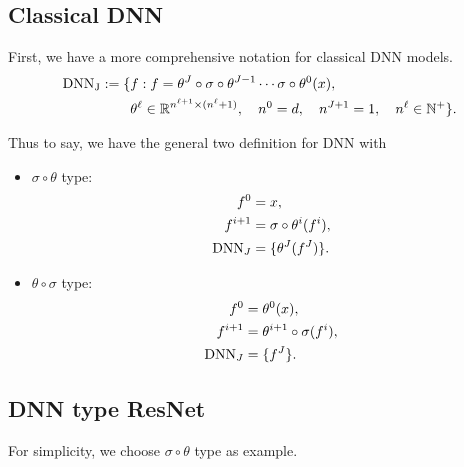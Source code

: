 \subsection{Classical DNN}
First, we have a more comprehensive notation for classical DNN models.
\begin{equation}\label{eq:DNNdef_J}
\begin{aligned}
{\rm{DNN}_J} :=\{& f:f=
\theta^J \circ \sigma \circ \theta^{J-1} \cdots \sigma \circ \theta^0(x), \\
&\theta^\ell \in \mathbb{R}^{n^{\ell+1} \times (n^\ell+1)}, \quad n^0 = d, \quad n^{J+1} = 1, \quad n^\ell \in \mathbb{N}^+\}.
\end{aligned}
\end{equation}

Thus to say, we have the general two definition for DNN with
\begin{itemize}
\item  $\sigma \circ \theta$ type:
\begin{equation}\label{eq:sigma+theta}
\begin{aligned}
f^0 &= x, \\
f^{i+1} &= \sigma \circ \theta^{i}(f^i), \\
{\rm DNN}_J &= \{\theta^J(f^J)\}.
\end{aligned}
\end{equation}

\item $\theta \circ \sigma $ type:
\begin{equation}\label{eq:theta+sigma}
\begin{aligned}
f^0 &= \theta^0(x), \\
f^{i+1} &=  \theta^{i+1} \circ \sigma (f^i), \\
{\rm DNN}_J &= \{f^J\}.
\end{aligned}
\end{equation}
\end{itemize}

\subsection{DNN type ResNet}
For simplicity, we choose $\sigma \circ \theta$ type as example.

